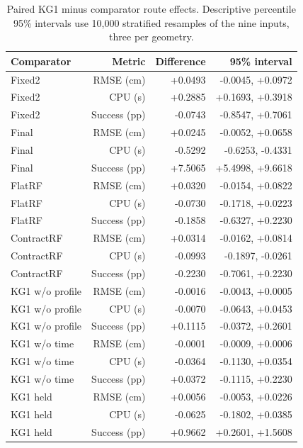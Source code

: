 \begin{table}[!htbp]\centering\footnotesize
\caption{Paired KG1 minus comparator route effects. Descriptive percentile 95\% intervals use 10,000 stratified resamples of the nine inputs, three per geometry.}\label{supp:routeeffects}
\begin{tabular}{@{}lrrr@{}}\toprule
Comparator & Metric & Difference & 95\% interval\\\midrule
Fixed2 & RMSE (cm) & +0.0493 & -0.0045, +0.0972\\
Fixed2 & CPU (s) & +0.2885 & +0.1693, +0.3918\\
Fixed2 & Success (pp) & -0.0743 & -0.8547, +0.7061\\
Final & RMSE (cm) & +0.0245 & -0.0052, +0.0658\\
Final & CPU (s) & -0.5292 & -0.6253, -0.4331\\
Final & Success (pp) & +7.5065 & +5.4998, +9.6618\\
FlatRF & RMSE (cm) & +0.0320 & -0.0154, +0.0822\\
FlatRF & CPU (s) & -0.0730 & -0.1718, +0.0223\\
FlatRF & Success (pp) & -0.1858 & -0.6327, +0.2230\\
ContractRF & RMSE (cm) & +0.0314 & -0.0162, +0.0814\\
ContractRF & CPU (s) & -0.0993 & -0.1897, -0.0261\\
ContractRF & Success (pp) & -0.2230 & -0.7061, +0.2230\\
KG1 w/o profile & RMSE (cm) & -0.0016 & -0.0043, +0.0005\\
KG1 w/o profile & CPU (s) & -0.0070 & -0.0643, +0.0453\\
KG1 w/o profile & Success (pp) & +0.1115 & -0.0372, +0.2601\\
KG1 w/o time & RMSE (cm) & -0.0001 & -0.0009, +0.0006\\
KG1 w/o time & CPU (s) & -0.0364 & -0.1130, +0.0354\\
KG1 w/o time & Success (pp) & +0.0372 & -0.1115, +0.2230\\
KG1 held & RMSE (cm) & +0.0056 & -0.0053, +0.0226\\
KG1 held & CPU (s) & -0.0625 & -0.1802, +0.0385\\
KG1 held & Success (pp) & +0.9662 & +0.2601, +1.5608\\
\bottomrule\end{tabular}\end{table}

